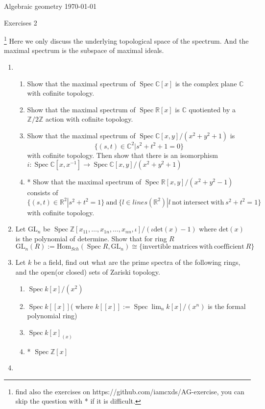 \documentclass[a4paper,11pt]{article}
\def\bb#1{\mathbb{#1}}
\def\bZ{\mathbb{Z}}
\def\Zmd#1{\bZ/#1\bZ}
\def\mrm#1{\mathrm{#1}}
\def\Hom{\mathrm{Hom}}
\DeclareMathOperator{\Spec}{Spec}
\begin{document}
{\small Algebraic geometry \hfill \today \\}
\begin{center}
\Huge Exercises 2
\end{center}

\vskip0.6cm
\footnote{find also the exercises on https://github.com/iamcxds/AG-exercise, you can skip the question with * if it is difficult.}
Here we only discuss the underlying topological space of the spectrum. And the maximal spectrum is the subspace of maximal ideals.
\begin{enumerate}[1.]
\item 
\begin{enumerate}
    \item Show that the maximal spectrum of $\Spec\bb{C}[x]$ is the complex plane $\bb{C}$ with cofinite topology.
    \item Show that the maximal spectrum of $\Spec \bb{R}[x]$ is $\bb{C}$ quotiented by a $\Zmd{2}$ action with cofinite topology.
    \item Show that the maximal spectrum of $\Spec \bb{C}[x,y]/(x^2+y^2+1)$ is 
    \[\{(s,t)\in \bb{C}^2|s^2+t^2+1=0\}\] with cofinite topology. Then show that there is an isomorphism $i: \Spec \bb{C}[x,x^{-1}] \to \Spec \bb{C}[x,y]/(x^2+y^2+1)$
    \item* Show that the maximal spectrum of $\Spec \bb{R}[x,y]/(x^2+y^2-1)$ consists of 
    \[\{(s,t)\in \bb{R}^2|s^2+t^2=1\} \mrm{ \ and\ } \{ l\in lines(\bb{R}^2)|l\mrm{ \ not \ intersect\ with\ } s^2+t^2=1\} \] 
    with cofinite topology.
    
\end{enumerate}
\item Let $\mrm{GL}_n$ be $ \Spec \bZ[x_{11},\ldots,x_{1n},\ldots,x_{nn},\iota]/(\iota\mrm{det}(x)-1) $ where $\mrm{det}(x)$ is the polynomial of determine. Show that for ring $R$ \[\mrm{GL}_n(R):=\Hom_{Sch}(\Spec R, \mrm{GL}_n)\cong 
\{\mrm{ invertible\ matrices\ with\ coefficient\ } R\} \]
\item Let $k$ be a field, find out what are the prime spectra of the following rings, and the open(or closed) sets of Zariski topology.
\begin{enumerate}
    \item  $\Spec k[x]/(x^2)$
    \item  $\Spec k[[x]]$( where $k[[x]] :=\Spec \lim_n k[x]/(x^n)$ is the formal polynomial ring)
    \item  $\Spec k[x]_{(x)}$
    \item*  $\Spec \bZ[x]$
\end{enumerate}
\item 




\end{enumerate}
\end{document}
